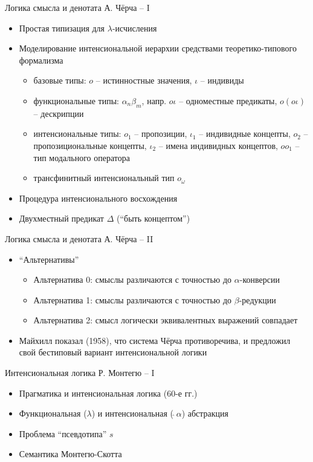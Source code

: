 \documentclass{beamer}
\begin{document}
\begin{frame}{Логика смысла и денотата А. Чёрча -- I}

\begin{itemize}
    \item Простая типизация для $\lambda$-исчисления
    \medskip
    \item Моделирование интенсиональной иерархии средствами теоретико-типового формализма
   	\medskip
         \begin{itemize} 
	        \item базовые типы: $o$ -- истинностные значения, $\iota$ -- индивиды
	        \item функциональные типы: $\alpha_n \beta_m$, напр. $o \iota$ -- одноместные предикаты, $o(o \iota)$ -- дескрипции
	        \item интенсиональные типы: $o_1$ -- пропозиции, $\iota_1$ -- индивидные концепты, $o_2$ -- пропозициональные концепты, $\iota_2$ -- имена индивидных концептов, $oo_1$ -- тип модального оператора
	        \item трансфинитный интенсиональный тип $o_\omega$
	    \end{itemize}
	\medskip
	\item Процедура интенсионального восхождения
	\medskip
	\item Двухместный предикат $\Delta$ (``быть концептом'')
\end{itemize}
\end{frame}

\begin{frame}{Логика смысла и денотата А. Чёрча -- II}
\begin{itemize}
    \item ``Альтернативы''
    \medskip
        \begin{itemize}
            \item Альтернатива 0: смыслы различаются с точностью до $\alpha$-конверсии
            \item Альтернатива 1: смыслы различаются с точностью до $\beta$-редукции
            \item Альтернатива 2: смысл логически эквивалентных выражений совпадает
        \end{itemize}
    \item Майхилл показал (1958), что система Чёрча противоречива, и предложил свой бестиповый вариант интенсиональной логики
\end{itemize}
\end{frame}

\begin{frame}{Интенсиональная логика Р. Монтегю -- I}
\begin{itemize}
    \item Прагматика и интенсиональная логика (60-е гг.)
    \medskip
    \item Функциональная ($\lambda$) и интенсиональная (\,$\hat{} \, \alpha$) абстракция
    \medskip 
    \item Проблема ``псевдотипа'' $s$
    \medskip
    \item Семантика Монтегю-Скотта    
\end{itemize}
\end{frame}
\end{document}
